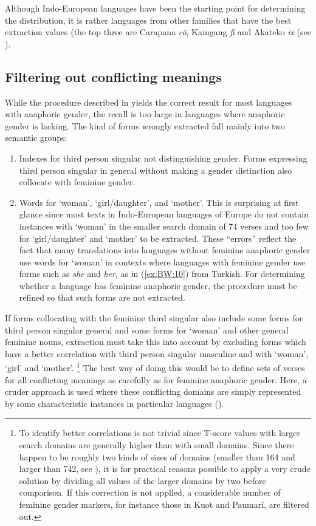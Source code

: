 \documentclass[output=collectionpaper]{langsci/langscibook}
\begin{document}
Although Indo-European languages have been the starting point for determining the distribution, it is rather languages from other families that have the best extraction values (the top three are Carapana \textit{cõ}, Kaingang \textit{fi} and Akateko \textit{ix} (see ).


\subsection{Filtering out conflicting meanings}
\label{sec:BW:3.3}

While the procedure described in  yields the correct result for most languages with anaphoric gender, the recall is too large in languages where anaphoric gender is lacking. The kind of forms wrongly extracted fall mainly into two semantic groups:

\begin{enumerate}[label=(\roman*)]
\item Indexes for third person singular not distinguishing gender. Forms expressing third person singular in general without making a gender distinction also collocate with feminine gender.
\item Words for ‘woman’, ‘girl/daughter’, and ‘mother’. This is surprising at first glance since most texts in Indo-European languages of Europe do not contain instances with ‘woman’ in the smaller search domain of 74 verses and too few for ‘girl/daughter’ and ‘mother’ to be extracted. These “errors” reflect the fact that many translations into languages without feminine anaphoric gender use words for ‘woman’ in contexts where languages with feminine gender use forms such as \textit{she} and \textit{her}, as in (\ref{ex:BW:10}) from Turkish. For determining whether a language has feminine anaphoric gender, the procedure must be refined so that such forms are not extracted.
\end{enumerate}

If forms collocating with the feminine third singular also include some forms for third person singular general and some forms for ‘woman’ and other general feminine nouns, extraction must take this into account by excluding forms which have a better correlation with third person singular masculine and with ‘woman’, ‘girl’ and ‘mother’.%
\footnote{%
To identify better correlations is not trivial since T-score values with larger search domains are generally higher than with small domains. Since there happen to be roughly two kinds of sizes of domains (smaller than 164 and larger than 742, see ), it is for practical reasons possible to apply a very crude solution by dividing all values of the larger domains by two before comparison. If this correction is not applied, a considerable number of feminine gender markers, for instance those in Kuot and Paumarí, are filtered out.
} %
The best way of doing this would be to define sets of verses for all conflicting meanings as carefully as for feminine anaphoric gender. Here, a cruder approach is used where these conflicting domains are simply represented by some characteristic instances in particular languages ().
\end{document}
